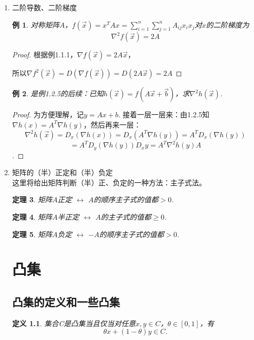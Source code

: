 \documentclass[12pt, a4paper, oneside]{ctexbook}
\newtheorem{theorem}{定理}[section]
\newtheorem{definition}[theorem]{定义}
\newtheorem{example}[theorem]{例}
\begin{document}
\begin{enumerate}
    \item 二阶导数、二阶梯度

\begin{example}
    对称矩阵$A$，$f(\vec x)=x^TAx=\sum_{i=1}^{n}\sum_{j=1}^{n}A_{ij}x_ix_j$对$x$的二阶梯度为
    $$\nabla ^2f(\vec x)=2A$$
\end{example}

\begin{proof}
    根据例1.1.1，$\nabla f(\vec x)=2A\vec x$，

    所以$\nabla f^2(\vec x)=D(\nabla f(\vec x))=D(2A\vec x)=2A$
\end{proof}

\begin{example}
    是例1.2.5的后续：已知$h(\vec x) = f(A\vec x+\vec b)$，求$\nabla^2 h(\vec x)$.
\end{example}

\begin{proof}
    为方便理解，记$y=Ax+b$. 接着一层一层来：由1.2.5知
    $\nabla h(x)=A^T \nabla h(y)$，然后再来一层：
    $$\nabla^2 h(\vec x)=D_x(\nabla h(x))=D_x(A^T \nabla h(y))=A^T D_x(\nabla h(y))$$
    $$=A^T D_y(\nabla h(y))D_xy=A^T\nabla^2h(y)A$$.
\end{proof}

    \item 矩阵的（半）正定和（半）负定 \\
这里将给出矩阵判断（半）正、负定的一种方法：主子式法。
\begin{theorem}
    矩阵$A$正定 $\leftrightarrow$ $A$的顺序主子式的值都$>0$. 
\end{theorem}

\begin{theorem}
    矩阵$A$半正定 $\leftrightarrow$ $A$的主子式的值都$\geq 0$. 
\end{theorem}

\begin{theorem}
    矩阵$A$负定 $\leftrightarrow$ $-A$的顺序主子式的值都$>0$. 
\end{theorem}


\chapter{凸集}

\section{凸集的定义和一些凸集}
\begin{definition}
    集合C是凸集当且仅当对任意$x,y\in C$，$\theta \in [0,1]$，有
    $$\theta x+(1-\theta)y\in C.$$
\end{definition}


\end{enumerate}
\end{document}
